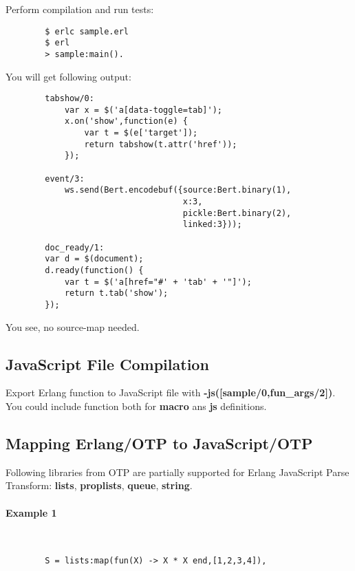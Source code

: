 \newpage
Perform compilation and run tests:

\vspace{1\baselineskip}
\begin{lstlisting}
        $ erlc sample.erl
        $ erl
        > sample:main().
\end{lstlisting}
\vspace{1\baselineskip}

You will get following output:

\vspace{1\baselineskip}
\begin{lstlisting}
        tabshow/0:
            var x = $('a[data-toggle=tab]');
            x.on('show',function(e) {
                var t = $(e['target']);
                return tabshow(t.attr('href'));
            });

        event/3:
            ws.send(Bert.encodebuf({source:Bert.binary(1),
                                    x:3,
                                    pickle:Bert.binary(2),
                                    linked:3}));

        doc_ready/1:
        var d = $(document);
        d.ready(function() {
            var t = $('a[href="#' + 'tab' + '"]');
            return t.tab('show');
        });
\end{lstlisting}
\vspace{1\baselineskip}

You see, no source-map needed.

\subsection{JavaScript File Compilation}
Export Erlang function to JavaScript file with {\bf -js([sample/0,fun\_{args}/2])}.
You could include function both for {\bf macro} ans {\bf js} definitions.

\newpage
\subsection{Mapping Erlang/OTP to JavaScript/OTP}
Following libraries from OTP are partially supported for Erlang JavaScript Parse Transform: 
{\bf lists}, {\bf proplists}, {\bf queue}, {\bf string}.

\paragraph{\bf Example 1}\ 
\vspace{1\baselineskip}
\begin{lstlisting}
        S = lists:map(fun(X) -> X * X end,[1,2,3,4]),
\end{lstlisting}

